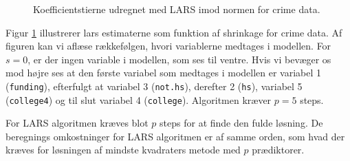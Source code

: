 \begin{figure}[H]
\centering
{}
\caption{Koefficientstierne udregnet med LARS imod normen for crime data.} \label{fig:crime_lar}
\end{figure}
%
Figur \ref{fig:crime_lar} illustrerer lars estimaterne som funktion af shrinkage for crime data.
Af figuren kan vi aflæse rækkefølgen, hvori variablerne medtages i modellen.
For \(s=0\), er der ingen variable i modellen, som ses til ventre.
Hvis vi bevæger os mod højre ses at den første variabel som medtages i modellen er variabel 1 (\texttt{funding}), efterfulgt at variabel 3 (\texttt{not.hs}), derefter 2 (\texttt{hs}), variabel 5 (\texttt{college4}) og til slut variabel 4 (\texttt{college}). 
Algoritmen kræver \(p=5\) steps.
%

For LARS algoritmen kræves blot \(p\) steps for at finde den fulde løsning.
De beregnings omkostninger for LARS algoritmen er af samme orden, som hvad der kræves for løsningen af mindste kvadraters metode med \(p\) prædiktorer.


